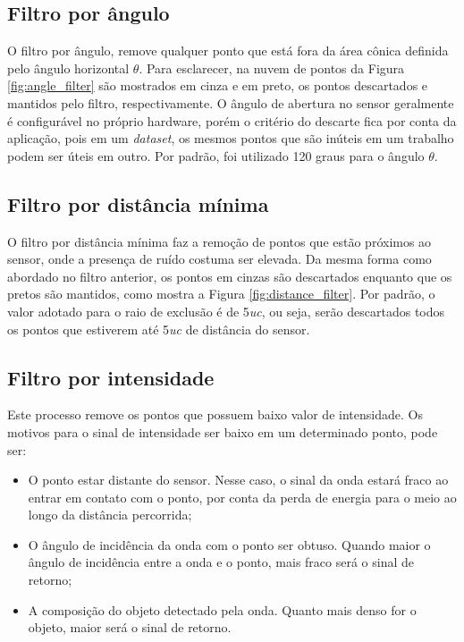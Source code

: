 \subsection{Filtro por ângulo}
\label{sec:angle_filter}

O filtro por ângulo, remove qualquer ponto que está fora da área cônica definida pelo ângulo horizontal $\theta$. Para esclarecer, na nuvem de pontos da Figura \ref{fig:angle_filter} são mostrados em cinza e em preto, os pontos descartados e mantidos pelo filtro, respectivamente.
O ângulo de abertura no sensor geralmente é configurável no próprio hardware, porém o critério do descarte fica por conta da aplicação, pois em um \textit{dataset}, os mesmos pontos que são inúteis em um trabalho podem ser úteis em outro. 
Por padrão, foi utilizado 120 graus para o ângulo $\theta$.

\subsection{Filtro por distância mínima}
\label{sec:distance_filter}

O filtro por distância mínima faz a remoção de pontos que estão próximos ao sensor, onde a presença de ruído costuma ser elevada. Da mesma forma como abordado no filtro anterior, os pontos em cinzas são descartados enquanto que os pretos são mantidos, como mostra a Figura \ref{fig:distance_filter}. Por padrão, o valor adotado para o raio de exclusão é de 5\textit{uc}, ou seja, serão descartados todos os pontos que estiverem até 5\textit{uc} de distância do sensor.

\subsection{Filtro por intensidade}
\label{sec:intensity_filter}

Este processo remove os pontos que possuem baixo valor de intensidade. Os motivos para o sinal de intensidade ser baixo em um determinado ponto, pode ser:
    \begin{itemize}
        \item O ponto estar distante do sensor. Nesse caso, o sinal da onda estará fraco ao entrar em contato com o ponto, por conta da perda de energia para o meio ao longo da distância percorrida;
        \item O ângulo de incidência da onda com o ponto ser obtuso. Quando maior o ângulo de incidência entre a onda e o ponto, mais fraco será o sinal de retorno;
        \item A composição do objeto detectado pela onda. Quanto mais denso for o objeto, maior será o sinal de retorno.
    \end{itemize}

